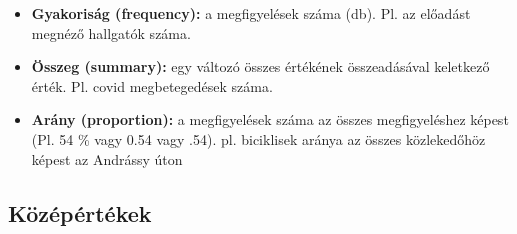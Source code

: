 \documentclass[
  letterpaper,
  DIV=11,
  numbers=noendperiod]{scrreprt}
\begin{document}
\begin{itemize}
\item
  \textbf{Gyakoriság (frequency):} a megfigyelések száma (db). Pl. az
  előadást megnéző hallgatók száma.
\item
  \textbf{Összeg (summary):} egy változó összes értékének összeadásával
  keletkező érték. Pl. covid megbetegedések száma.
\item
  \textbf{Arány (proportion):} a megfigyelések száma az összes
  megfigyeléshez képest (Pl. 54 \% vagy 0.54 vagy .54). pl. biciklisek
  aránya az összes közlekedőhöz képest az Andrássy úton
\end{itemize}

\hypertarget{kuxf6zuxe9puxe9rtuxe9kek}{%
\subsection{Középértékek}\label{kuxf6zuxe9puxe9rtuxe9kek}}
\end{document}
